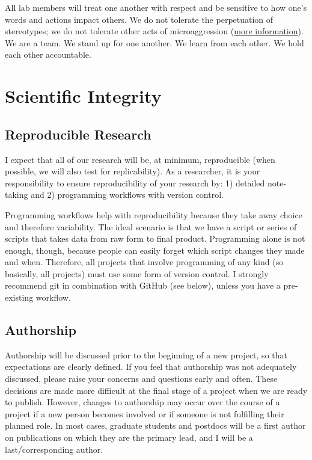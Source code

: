 \documentclass[
]{book}
\begin{document}
All lab members will treat one another with respect and be sensitive to how one's words and actions impact others. We do not tolerate the perpetuation of stereotypes; we do not tolerate other acts of microaggression (\href{https://www.washington.edu/teaching/topics/inclusive-teaching/addressing-microaggressions-in-the-classroom/}{more information}). We are a team. We stand up for one another. We learn from each other. We hold each other accountable.

\hypertarget{scientific-integrity}{%
\section{Scientific Integrity}\label{scientific-integrity}}

\hypertarget{reproducible-research}{%
\subsection{Reproducible Research}\label{reproducible-research}}

I expect that all of our research will be, at minimum, reproducible (when possible, we will also test for replicability). As a researcher, it is your responsibility to ensure reproducibility of your research by: 1) detailed note-taking and 2) programming workflows with version control.

Programming workflows help with reproducibility because they take away choice and therefore variability. The ideal scenario is that we have a script or series of scripts that takes data from raw form to final product. Programming alone is not enough, though, because people can easily forget which script changes they made and when. Therefore, all projects that involve programming of any kind (so basically, all projects) must use some form of version control. I strongly recommend git in combination with GitHub (see below), unless you have a pre-existing workflow.

\hypertarget{authorship}{%
\subsection{Authorship}\label{authorship}}

Authorship will be discussed prior to the beginning of a new project, so that expectations are clearly defined. If you feel that authorship was not adequately discussed, please raise your concerns and questions early and often. These decisions are made more difficult at the final stage of a project when we are ready to publish. However, changes to authorship may occur over the course of a project if a new person becomes involved or if someone is not fulfilling their planned role. In most cases, graduate students and postdocs will be a first author on publications on which they are the primary lead, and I will be a last/corresponding author.
\end{document}
